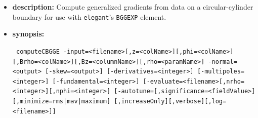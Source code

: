 \documentclass[11pt]{article}
\begin{document}
\begin{itemize}
\item {\bf description:}  Compute generalized gradients \cite{Venturini-NIMA427-387} from data on a circular-cylinder
boundary for use with {\tt elegant}'s \verb|BGGEXP| element.

\item {\bf synopsis:}
\begin{flushleft}{\tt
computeCBGGE -input=<filename>[,z=<colName>][,phi=<colName>][,Brho=<colName>][,Bz=<columnName>][,rho=<paramName>]
              -normal=<output> [-skew=<output>]
              [-derivatives=<integer>] [-multipoles=<integer>] [-fundamental=<integer>]
              [-evaluate=<filename>[,nrho=<integer>][,nphi=<integer>]
              [-autotune=[,significance=<fieldValue>][,minimize={rms|mav|maximum}]
                         [,increaseOnly][,verbose][,log=<filename>]]
}\end{flushleft}


\end{itemize}
\end{document}
